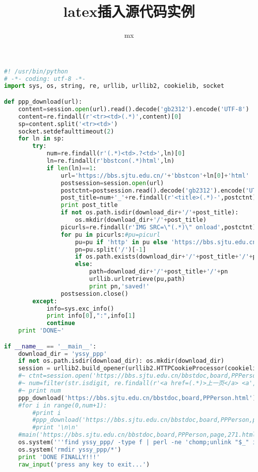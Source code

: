 \documentclass{article}
\begin{document}

\title{latex插入源代码实例}
\author{mx}
\maketitle

\begin{lstlisting}[language={Python}]
#! /usr/bin/python 
# -*- coding: utf-8 -*- 
import sys, os, string, re, urllib, urllib2, cookielib, socket

def ppp_download(url):
    content=session.open(url).read().decode('gb2312').encode('UTF-8')
    content=re.findall(r'<tr><td>(.*)',content)[0]
    sp=content.split('<tr><td>')
    socket.setdefaulttimeout(2)
    for ln in sp:
        try:
            num=re.findall(r'(.*)<td>.?<td>',ln)[0]
            ln=re.findall(r'bbstcon(.*)html',ln)
            if len(ln)==1:
                url='https://bbs.sjtu.edu.cn/'+'bbstcon'+ln[0]+'html'
                postsession=session.open(url)
                postctnt=postsession.read().decode('gb2312').encode('UTF-8')#the encoding problem is solved!!!
                post_title=num+'_'+re.findall(r'<title>(.*)-',postctnt)[0]
                print post_title
                if not os.path.isdir(download_dir+'/'+post_title):
                    os.mkdir(download_dir+'/'+post_title)
                picurls=re.findall(r'IMG SRC=\"(.*)\" onload',postctnt)
                for pu in picurls:#pu=picurl
                    pu=pu if 'http' in pu else 'https://bbs.sjtu.edu.cn/'+pu
                    pn=pu.split('/')[-1]
                    if os.path.exists(download_dir+'/'+post_title+'/'+pn): print pn, 'already exists!'
                    else:
                        path=download_dir+'/'+post_title+'/'+pn
                        urllib.urlretrieve(pu,path)
                        print pn,'saved!'
                postsession.close()
        except:
            info=sys.exc_info()  
            print info[0],":",info[1]  
            continue
    print 'DONE~'

if __name__ == '__main__':
    download_dir = 'yssy_ppp'
    if not os.path.isdir(download_dir): os.mkdir(download_dir)
    session = urllib2.build_opener(urllib2.HTTPCookieProcessor(cookielib.CookieJar()))
    #~ ctnt=session.open('https://bbs.sjtu.edu.cn/bbstdoc,board,PPPerson.html').read().decode('gb2312').encode('UTF-8')
    #~ num=filter(str.isdigit, re.findall(r'<a href=(.*)>上一页</a> <a',ctnt)[0])
    #~ print num
    ppp_download('https://bbs.sjtu.edu.cn/bbstdoc,board,PPPerson.html')
    #for i in range(0,num+1):
        #print i
        #ppp_download('https://bbs.sjtu.edu.cn/bbstdoc,board,PPPerson,page,'+str(i)+'.html')
		#print '\n\n'
	#main('https://bbs.sjtu.edu.cn/bbstdoc,board,PPPerson,page,271.html')
    os.system('''find yssy_ppp/ -type f | perl -ne 'chomp;unlink "$_" if -T $_' ''')
    os.system('rmdir yssy_ppp/*')
    print 'DONE FINALLY!!!'
    raw_input('press any key to exit...')
\end{lstlisting}
\end{document}
